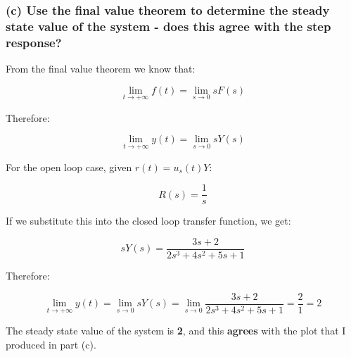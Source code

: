 \documentclass[12pt, letterpaper]{../assignment}
\begin{document}
\subsubsection*{(c) Use the final value theorem to determine the steady state value of the system - does this agree with the step response?}
    
From the final value theorem we know that:

$$ \lim_{t\to+\infty} f(t) = \lim_{s\to 0} s F(s) $$

Therefore:

$$ \lim_{t\to+\infty} y(t) = \lim_{s\to 0} s Y(s) $$

For the open loop case, given $r(t) = u_s(t) Y$:

$$R(s) = \frac{1}{s}$$

If we substitute this into the closed loop transfer function, we get:

$$ s Y(s) = \frac{3s+2}{2s^3 + 4s^2 + 5s + 1} $$

Therefore:

\begin{answer}
    $$ \lim_{t\to+\infty} y(t) = \lim_{s\to 0} s Y(s) =
        \lim_{s\to 0} \frac{3s+2}{2s^3 + 4s^2 + 5s + 1} = \frac{2}{1} = 2 $$
\end{answer}

\begin{answer}
The steady state value of the system is \textbf{2}, and this \textbf{agrees} with the plot that I produced in part (c).
\end{answer}
\end{document}

